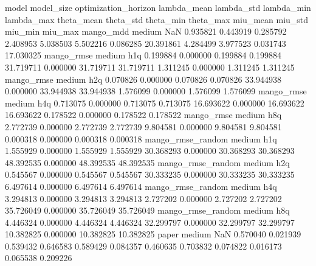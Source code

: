             model model_size optimization_horizon  lambda_mean  lambda_std  lambda_min  lambda_max  theta_mean  theta_std  theta_min  theta_max  miu_mean  miu_std   miu_min   miu_max
        mango_mdd     medium                  NaN     0.935821    0.443919    0.285792    2.408953    5.038503   5.502216   0.086285  20.391861  4.284499 3.977523  0.031743 17.030325
       mango_rmse     medium                  h1q     0.199884    0.000000    0.199884    0.199884   31.719711   0.000000  31.719711  31.719711  1.311245 0.000000  1.311245  1.311245
       mango_rmse     medium                  h2q     0.070826    0.000000    0.070826    0.070826   33.944938   0.000000  33.944938  33.944938  1.576099 0.000000  1.576099  1.576099
       mango_rmse     medium                  h4q     0.713075    0.000000    0.713075    0.713075   16.693622   0.000000  16.693622  16.693622  0.178522 0.000000  0.178522  0.178522
       mango_rmse     medium                  h8q     2.772739    0.000000    2.772739    2.772739    9.804581   0.000000   9.804581   9.804581  0.000318 0.000000  0.000318  0.000318
mango_rmse_random     medium                  h1q     1.555929    0.000000    1.555929    1.555929   30.368293   0.000000  30.368293  30.368293 48.392535 0.000000 48.392535 48.392535
mango_rmse_random     medium                  h2q     0.545567    0.000000    0.545567    0.545567   30.333235   0.000000  30.333235  30.333235  6.497614 0.000000  6.497614  6.497614
mango_rmse_random     medium                  h4q     3.294813    0.000000    3.294813    3.294813    2.727202   0.000000   2.727202   2.727202 35.726049 0.000000 35.726049 35.726049
mango_rmse_random     medium                  h8q     4.446324    0.000000    4.446324    4.446324   32.299797   0.000000  32.299797  32.299797 10.382825 0.000000 10.382825 10.382825
            paper     medium                  NaN     0.570040    0.021939    0.539432    0.646583    0.589429   0.084357   0.460635   0.703832  0.074822 0.016173  0.065538  0.209226